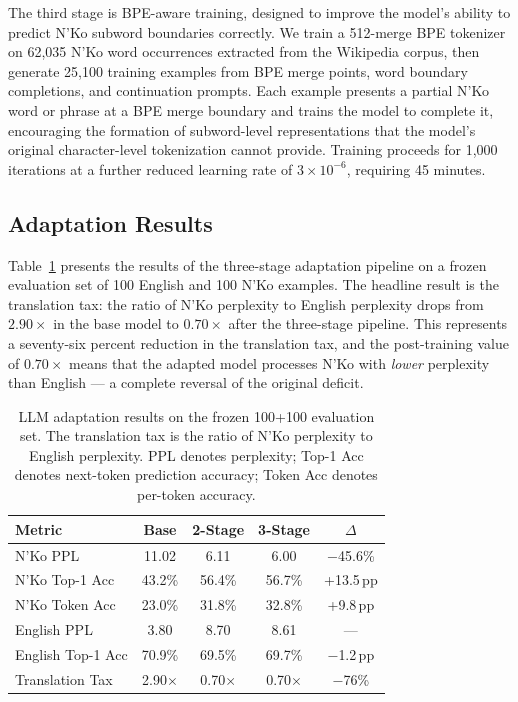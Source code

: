 \documentclass[11pt]{article}
\newcommand{\nko}{N'Ko}
\begin{document}
The third stage is BPE-aware training, designed to improve the model's ability to predict \nko{} subword boundaries correctly. We train a 512-merge BPE tokenizer on 62,035 \nko{} word occurrences extracted from the Wikipedia corpus, then generate 25,100 training examples from BPE merge points, word boundary completions, and continuation prompts. Each example presents a partial \nko{} word or phrase at a BPE merge boundary and trains the model to complete it, encouraging the formation of subword-level representations that the model's original character-level tokenization cannot provide. Training proceeds for 1,000 iterations at a further reduced learning rate of $3 \times 10^{-6}$, requiring 45 minutes.

\subsection{Adaptation Results}
\label{sec:adaptation_results}

Table~\ref{tab:adaptation} presents the results of the three-stage adaptation pipeline on a frozen evaluation set of 100 English and 100 \nko{} examples. The headline result is the translation tax: the ratio of \nko{} perplexity to English perplexity drops from $2.90\times$ in the base model to $0.70\times$ after the three-stage pipeline. This represents a seventy-six percent reduction in the translation tax, and the post-training value of $0.70\times$ means that the adapted model processes \nko{} with \emph{lower} perplexity than English --- a complete reversal of the original deficit.

\begin{table}[ht]
\centering
\caption{LLM adaptation results on the frozen 100+100 evaluation set. The translation tax is the ratio of \nko{} perplexity to English perplexity. PPL denotes perplexity; Top-1 Acc denotes next-token prediction accuracy; Token Acc denotes per-token accuracy.}
\label{tab:adaptation}
\begin{tabular}{@{}lcccc@{}}
\toprule
Metric & Base & 2-Stage & 3-Stage & $\Delta$ \\
\midrule
\nko{} PPL & 11.02 & 6.11 & 6.00 & $-$45.6\% \\
\nko{} Top-1 Acc & 43.2\% & 56.4\% & 56.7\% & +13.5\,pp \\
\nko{} Token Acc & 23.0\% & 31.8\% & 32.8\% & +9.8\,pp \\
English PPL & 3.80 & 8.70 & 8.61 & --- \\
English Top-1 Acc & 70.9\% & 69.5\% & 69.7\% & $-$1.2\,pp \\
Translation Tax & 2.90$\times$ & 0.70$\times$ & 0.70$\times$ & $-$76\% \\
\bottomrule
\end{tabular}
\end{table}
\end{document}
